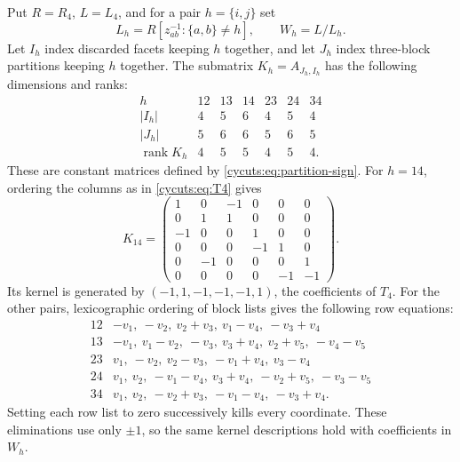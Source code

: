 Put $R=R_4$, $L=L_4$, and for a pair $h=\{i,j\}$ set
\[
 L_h=R[z_{ab}^{-1}:\{a,b\}\ne h],\qquad W_h=L/L_h.
\]
Let $I_h$ index discarded facets keeping $h$ together, and let
$J_h$ index three-block partitions keeping $h$ together. The submatrix
$K_h=A_{J_h,I_h}$ has the following dimensions and ranks:
\[
 \begin{array}{c|rrrrrr}
 h&12&13&14&23&24&34\\\hline
 |I_h|&4&5&6&4&5&4\\
 |J_h|&5&6&6&5&6&5\\
 \operatorname{rank}K_h&4&5&5&4&5&4.
 \end{array}
\]
These are constant matrices defined by
\eqref{cycuts:eq:partition-sign}. For $h=14$, ordering the columns
as in \eqref{cycuts:eq:T4} gives
\[
 K_{14}=\begin{pmatrix}
 1&0&-1&0&0&0\\0&1&1&0&0&0\\-1&0&0&1&0&0\\
 0&0&0&-1&1&0\\0&-1&0&0&0&1\\0&0&0&0&-1&-1
 \end{pmatrix}.
\]
Its kernel is generated by $(-1,1,-1,-1,-1,1)$, the coefficients
of $T_4$. For the other pairs, lexicographic ordering of block lists
gives the following row equations:
\[
 \begin{array}{c|l}
 12&-v_1,\ -v_2,\ v_2+v_3,\ v_1-v_4,\ -v_3+v_4\\
 13&-v_1,\ v_1-v_2,\ -v_3,\ v_3+v_4,\ v_2+v_5,\ -v_4-v_5\\
 23&v_1,\ -v_2,\ v_2-v_3,\ -v_1+v_4,\ v_3-v_4\\
 24&v_1,\ v_2,\ -v_1-v_4,\ v_3+v_4,\ -v_2+v_5,\ -v_3-v_5\\
 34&v_1,\ v_2,\ -v_2+v_3,\ -v_1-v_4,\ -v_3+v_4.
 \end{array}
\]
Setting each row list to zero successively kills every coordinate.
These eliminations use only $\pm1$, so the same kernel descriptions
hold with coefficients in $W_h$.

